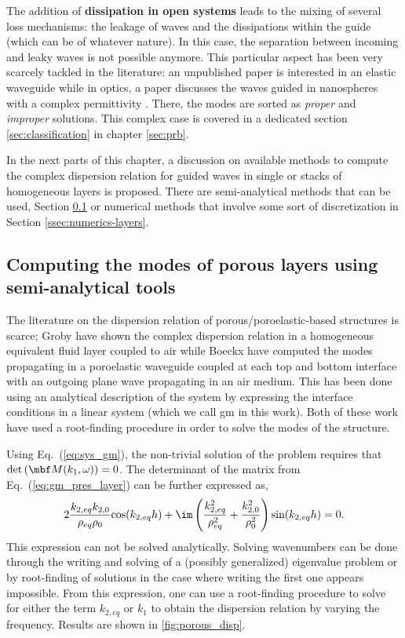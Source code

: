 The addition of \textbf{dissipation in open systems} leads to the mixing of several loss mechanisms: the leakage of waves and the dissipations within the guide (which can be of whatever nature). In this case, the separation between incoming and leaky waves is not possible anymore. This particular aspect has been very scarcely tackled in the literature: an unpublished paper is interested in an elastic waveguide \cite{kiefer2020} while in optics, a paper discusses the waves guided in nanospheres with a complex permittivity \cite{campione2011}. There, the modes are sorted as \textit{proper} and \textit{improper} solutions. This complex case is covered in a dedicated section \ref{sec:classification} in chapter \ref{sec:prb}.

In the next parts of this chapter, a discussion on available methods to compute the complex dispersion relation for guided waves in single or stacks of homogeneous layers is proposed. There are semi-analytical methods that can be used, Section \ref{ssec:semi-analyt-layers} or numerical methods that involve some sort of discretization in Section \ref{ssec:numerics-layers}.

\subsection{Computing the modes of porous layers using semi-analytical tools}
\label{ssec:semi-analyt-layers}
The literature on the dispersion relation of porous/poroelastic-based structures is scarce; Groby \etal \cite{groby2008} have shown the complex dispersion relation in a homogeneous equivalent fluid layer coupled to air while Boeckx \etal\cite{boeckx2005} have computed the modes propagating in a poroelastic waveguide coupled at each top and bottom interface with an outgoing plane wave propagating in an air medium. This has been done using an analytical description of the system by expressing the interface conditions in a linear system (which we call \acrshort{gm} in this work). Both of these work have used a root-finding procedure in order to solve the modes of the structure.

Using Eq.~(\ref{eq:sys_gm}), the non-trivial solution of the problem requires that $\mathrm{det}\left(\mbf M(k_1, \omega)\right) = 0$. The determinant of the matrix from Eq.~(\ref{eq:gm_pres_layer}) can be further expressed as,
\begin{equation}
    2 \frac{k_{2,eq} k_{2,0}}{\rho_{eq} \rho_{0}} \text{cos}(k_{2,eq} h) + \im \left(\frac{k_{2,eq}^2}{\rho_{eq}^2} + \frac{k_{2,0}^2}{\rho_{0}^2}\right) \text{sin}(k_{2,eq} h) = 0.
    \label{eq:fluideq_sym_disp}
\end{equation}
This expression can not be solved analytically. Solving wavenumbers can be done through the writing and solving of a (possibly generalized) eigenvalue problem or by root-finding of solutions in the case where writing the first one appears impossible. From this expression, one can use a root-finding procedure to solve for either the term $k_{2,eq}$ or $k_1$ to obtain the dispersion relation by varying the frequency. Results are shown in \cref{fig:porous_disp}.

